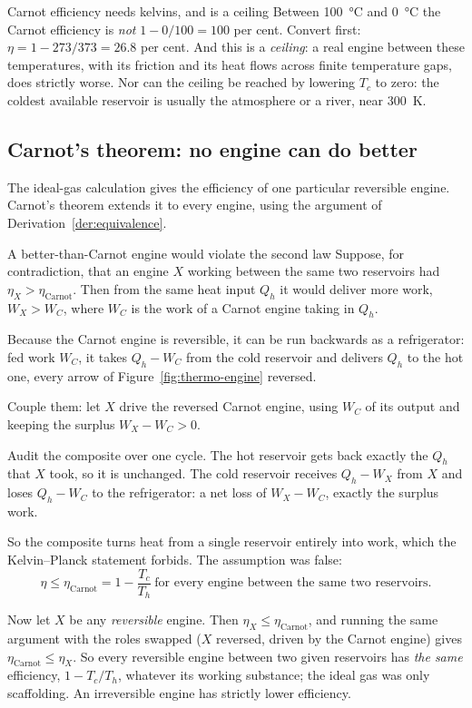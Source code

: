 \begin{trapbox}{Carnot efficiency needs kelvins, and is a ceiling}
Between \SI{100}{\celsius} and \SI{0}{\celsius} the Carnot efficiency is \emph{not}
$1-0/100=100$ per cent. Convert first: $\eta=1-273/373=26.8$ per cent. And this is a \emph{ceiling}: a
real engine between these temperatures, with its friction and its heat flows across finite temperature
gaps, does strictly worse. Nor can the ceiling be reached by lowering $T_c$ to zero: the coldest
available reservoir is usually the atmosphere or a river, near \SI{300}{K}.
\end{trapbox}

\subsection{Carnot's theorem: no engine can do better}\label{sec:carnot-theorem}

The ideal-gas calculation gives the efficiency of one particular reversible engine. Carnot's theorem
extends it to every engine, using the argument of Derivation~\ref{der:equivalence}.

\begin{derivbox}{A better-than-Carnot engine would violate the second law}\label{der:carnot-theorem}
 Suppose, for contradiction, that an engine $X$ working between the same two reservoirs had
$\eta_X>\eta_{\text{Carnot}}$. Then from the same heat input $Q_h$ it would deliver more work,
$W_X>W_C$, where $W_C$ is the work of a Carnot engine taking in $Q_h$.

 Because the Carnot engine is reversible, it can be run backwards as a refrigerator: fed work
$W_C$, it takes $Q_h-W_C$ from the cold reservoir and delivers $Q_h$ to the hot one, every arrow of
Figure~\ref{fig:thermo-engine} reversed.

 Couple them: let $X$ drive the reversed Carnot engine, using $W_C$ of its output and keeping the
surplus $W_X-W_C>0$.

 Audit the composite over one cycle. The hot reservoir gets back exactly the $Q_h$ that $X$ took,
so it is unchanged. The cold reservoir receives $Q_h-W_X$ from $X$ and loses $Q_h-W_C$ to the
refrigerator: a net loss of $W_X-W_C$, exactly the surplus work.

 So the composite turns heat from a single reservoir entirely into work, which the Kelvin--Planck
statement forbids. The assumption was false:
\[
\boxed{\;\eta\le\eta_{\text{Carnot}}=1-\frac{T_c}{T_h}\ \text{for every engine between the same two reservoirs.}\;}
\]

 Now let $X$ be any \emph{reversible} engine. Then $\eta_X\le\eta_{\text{Carnot}}$, and running the
same argument with the roles swapped ($X$ reversed, driven by the Carnot engine) gives
$\eta_{\text{Carnot}}\le\eta_X$. So every reversible engine between two given reservoirs has
\emph{the same} efficiency, $1-T_c/T_h$, whatever its working substance; the ideal gas was only scaffolding.
An irreversible engine has strictly lower efficiency.
\end{derivbox}

